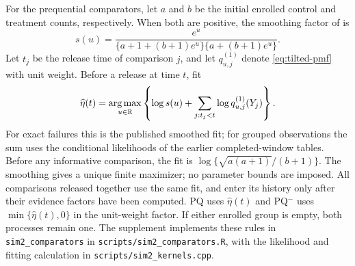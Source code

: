 \documentclass[12pt]{article}
\theoremstyle{definition}
\theoremstyle{remark}
\begin{document}
For the prequential comparators, let $a$ and $b$ be the initial enrolled control and treatment counts, respectively. When both are positive, the smoothing factor of \citet[Section~3.2, equation~(3.7)]{TerSchureEtAl2024} is
\[
 s(u)=\frac{e^u}{\{a+1+(b+1)e^u\}\{a+(b+1)e^u\}}.
\]
Let $t_j$ be the release time of comparison $j$, and let $q_{u,j}^{(1)}$ denote \eqref{eq:tilted-pmf} with unit weight. Before a release at time $t$, fit
\[
 \widehat\eta(t)=\mathop{\rm arg\,max}_{u\in\mathbb R}
 \left\{\log s(u)+\sum_{j:t_j<t}\log q_{u,j}^{(1)}(Y_j)\right\}.
\]
For exact failures this is the published smoothed fit; for grouped observations the sum uses the conditional likelihoods of the earlier completed-window tables. Before any informative comparison, the fit is $\log\{\sqrt{a(a+1)}/(b+1)\}$. The smoothing gives a unique finite maximizer; no parameter bounds are imposed. All comparisons released together use the same fit, and enter its history only after their evidence factors have been computed. PQ uses $\widehat\eta(t)$ and PQ$^-$ uses $\min\{\widehat\eta(t),0\}$ in the unit-weight factor. If either enrolled group is empty, both processes remain one. The supplement implements these rules in \texttt{sim2\_comparators} in \texttt{scripts/sim2\_comparators.R}, with the likelihood and fitting calculation in \texttt{scripts/sim2\_kernels.cpp}.
\end{document}
